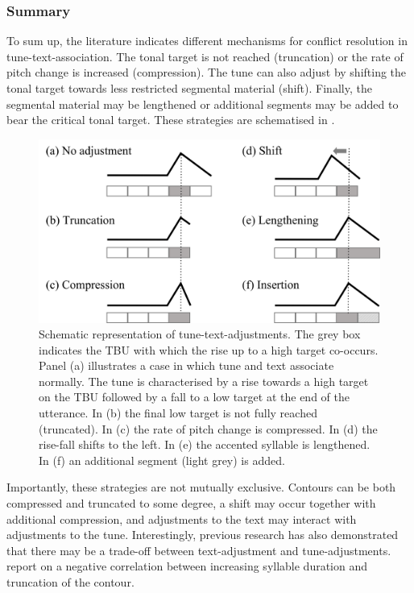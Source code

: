 \subsubsection{Summary}
To sum up, the literature indicates different mechanisms for conflict resolution in tune-text-association. The tonal target is not reached (truncation) or the rate of pitch change is increased (compression). The tune can also adjust by shifting the tonal target towards less restricted segmental material (shift). Finally, the segmental material may be lengthened or additional segments may be added to bear the critical tonal target. These strategies are schematised in .

\begin{figure}
  \centering 
   \includegraphics[width=1\textwidth]{figures/Figure_2_5.png}
  \caption{Schematic representation of tune-text-adjustments. The grey box indicates the TBU with which the rise up to a high target co-occurs. Panel (a) illustrates a case in which tune and text associate normally. The tune is characterised by a rise towards a high target on the TBU followed by a fall to a low target at the end of the utterance. In (b) the final low target is not fully reached (truncated). In (c) the rate of pitch change is compressed. In (d) the rise-fall shifts to the left. In (e) the accented syllable is lengthened. In (f) an additional segment (light grey) is added.}
   \label{fig:2.5}
   \end{figure}
   
Importantly, these strategies are not mutually exclusive. Contours can be both compressed and truncated to some degree, a shift may occur together with additional compression, and adjustments to the text may interact with adjustments to the tune. Interestingly, previous research has also demonstrated that there may be a trade-off between text-adjustment and tune-adjustments. \citet{PrietoOrtega2009} report on a negative correlation between increasing syllable duration and truncation of the contour.

